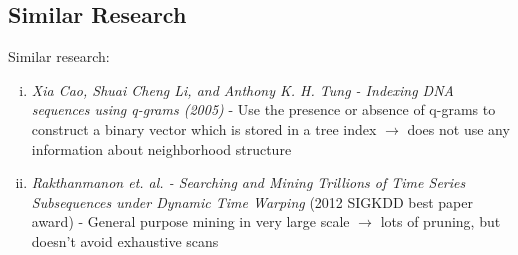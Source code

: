 \documentclass[9pt]{beamer}
\let\oldcite=\cite
\renewcommand\cite[1]{\hypersetup{linkcolor=magenta} \hyperlink{#1}{\oldcite{#1}}}
\begin{document}
\subsection{Similar Research}
\begin{frame}
	Similar research:
	\begin{enumerate}[(i)]
		\item \textit{Xia Cao, Shuai Cheng Li, and Anthony K. H. Tung - Indexing DNA sequences using q-grams (2005)} \cite{cao2005indexing} - Use the presence or absence of q-grams to construct a binary vector which is stored in a tree index $ \to $ does not use any information about neighborhood structure
		\item \textit{Rakthanmanon et. al. - Searching and Mining Trillions of Time Series Subsequences under Dynamic Time Warping}\cite{rakthanmanon2012searching} (2012 SIGKDD best paper award) - General purpose mining in very large scale $ \to $ lots of pruning, but doesn't avoid exhaustive scans
	\end{enumerate}
\end{frame}
\end{document}
